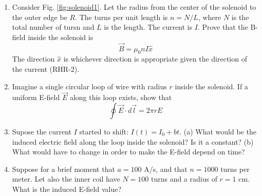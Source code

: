\documentclass{article}
\begin{document}
\begin{enumerate}
\item Consider Fig. \ref{fig:solenoid1}.  Let the radius from the center of the solenoid to the outer edge be $R$.  The turns per unit length is $n = N/L$, where $N$ is the total number of tursn and $L$ is the length.  The current is $I$.  Prove that the B-field inside the solenoid is 
\begin{equation}
\vec{B} = \mu_0 n I\hat{x}
\end{equation}
The direction $\hat{x}$ is whichever direction is appropriate given the direction of the current (RHR-2). \\ \vspace{1cm}
\item Imagine a single circular loop of wire with radius $r$ inside the solenoid.  If a uniform E-field $\vec{E}$ along this loop exists, show that 
\begin{equation}
\oint \vec{E} \cdot d\vec{l} = 2\pi r E
\end{equation}
\vspace{1cm}
\item Supose the current $I$ started to shift: $I(t) = I_0 + bt$.  (a) What would be the induced electric field along the loop inside the solenoid? Is it a constant? (b) What would have to change in order to make the E-field depend on time? \\ \vspace{2cm}
\item Suppose for a brief moment that $a = 100$ A/s, and that $n = 1000$ turns per meter.  Let also the inner coil have $N = 100$ turns and a radius of $r = 1$ cm.  What is the induced E-field value?
\end{enumerate}
\end{document}
